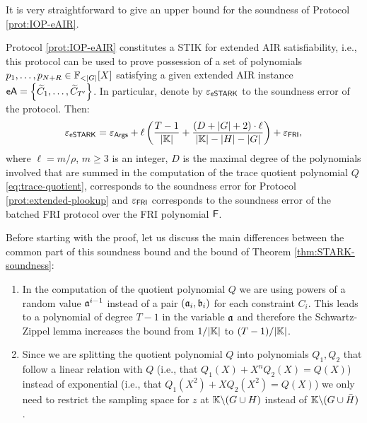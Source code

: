 \ifSOUNDNESS

It is very straightforward to give an upper bound for the soundness of Protocol \ref{prot:IOP-eAIR}.
\begin{theorem}\label{thm:STIK}
  Protocol \ref{prot:IOP-eAIR} constitutes a STIK for extended AIR satisfiability, i.e., this protocol can be used to prove possession of a set of polynomials $p_1,\dots,p_{N+R} \in \FF_{<|G|}[X]$ satisfying a given extended AIR instance $\textsf{eA} = \left\{\widetilde{C}_1,\dots,\widetilde{C}_{T'}\right\}$. In particular, denote by $\varepsilon_{\textsf{eSTARK}}$ to the soundness error of the protocol. Then:
    \[
      \varepsilon_{\textsf{eSTARK}} = \varepsilon_{\textsf{Args}} + \ell \left(\frac{T-1}{|\mathbb{K}|} + \frac{(D + |G| + 2)\cdot \ell}{|\mathbb{K}|-|H|-|G|}\right) + \varepsilon_{\textsf{FRI}},
    \]
  where $\ell = m/\rho$, $m \geq 3$ is an integer, $D$ is the maximal degree of the polynomials involved that are summed in the computation of the trace quotient polynomial $Q$ \eqref{eq:trace-quotient}, \eArgs corresponds to the soundness error for Protocol \ref{prot:extended-plookup} and $\varepsilon_{\textsf{FRI}}$ corresponds to the soundness error of the batched FRI protocol over the FRI polynomial $\textsf{F}$.
\end{theorem}

Before starting with the proof, let us discuss the main differences between the common part of this soundness bound and the bound of Theorem \ref{thm:STARK-soundness}:
\begin{enumerate}
  \item In the computation of the quotient polynomial $Q$ we are using powers of a random value $\mathfrak{a}^{i-1}$ instead of a pair $(\mathfrak{a}_i,\mathfrak{b}_i)$ for each constraint $C_i$. This leads to a polynomial of degree $T-1$ in the variable $\mathfrak{a}$ and therefore the Schwartz-Zippel lemma increases the bound from $1/|\mathbb{K}|$ to $(T-1)/|\mathbb{K}|$.
  \item Since we are splitting the quotient polynomial $Q$ into polynomials $Q_1,Q_2$ that follow a linear relation with $Q$ (i.e., that $Q_1(X) + X^nQ_2(X) = Q(X)$) instead of exponential (i.e., that $Q_1(X^2) + XQ_2(X^2) = Q(X)$) we only need to restrict the sampling space for $z$ at $\mathbb{K} \backslash (G \cup H)$ instead of $\mathbb{K} \backslash (G \cup \bar{H})$.
\end{enumerate}

